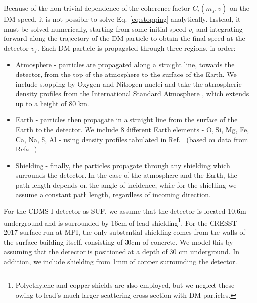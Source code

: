 \documentclass[prd,twocolumn,showpacs,nofootinbib,aps]{revtex4-1}
\begin{document}
Because of the non-trivial dependence of the coherence factor $C_i(m_\chi, v)$ on the DM speed, it is not possible to solve Eq.~\eqref{eq:stopping} analytically. Instead, it must be solved numerically, starting from some initial speed $v_i$ and integrating forward along the trajectory of the DM particle to obtain the final speed at the detector $v_f$. Each DM particle is propagated through three regions, in order:
\begin{itemize}
\item Atmosphere - particles are propagated along a straight line, towards the detector, from the top of the atmosphere to the surface of the Earth. We include stopping by Oxygen and Nitrogen nuclei and take the atmospheric density profiles from the International Standard Atmosphere \cite{ISA}, which extends up to a height of 80 km.
\item Earth - particles then propagate in a straight line from the surface of the Earth to the detector. We include 8 different Earth elements - O, Si, Mg, Fe, Ca, Na, S, Al - using density profiles tabulated in Ref.~\cite{Lundberg:2004dn} (based on data from Refs.~\cite{Geochemistry,Britannica}).
\item Shielding - finally, the particles propagate through any shielding which surrounds the detector. In the case of the atmosphere and the Earth, the path length depends on the angle of incidence, while for the shielding we assume a constant path length, regardless of incoming direction. 
\end{itemize}

For the CDMS-I detector as SUF, we assume that the detector is located 10.6m underground and is surrounded by 16cm of lead shielding\footnote{Polyethylene and copper shields are also employed, but we neglect these owing to lead's much larger scattering cross section with DM particles.}. For the CRESST 2017 surface run at MPI, the only substantial shielding comes from the walls of the surface building itself, consisting of 30cm of concrete. We model this by assuming that the detector is positioned at a depth of 30 cm underground. In addition, we include shielding from 1mm of copper surrounding the detector.
\end{document}
